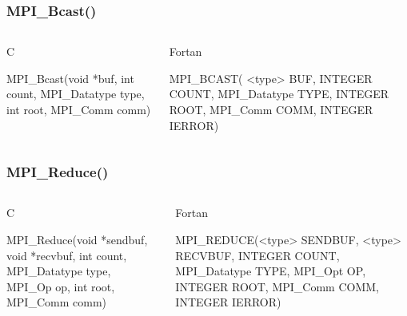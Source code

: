 \documentclass{beamer}
\begin{document}
\begin{frame}[fragile]
\frametitle{MPI\_Bcast()}
   \begin{columns}[T]
    \begin{column}{5cm}
     \begin{block}{C}
      \begin{semiverbatim}
MPI\_Bcast(void   *buf,
           int  count,
  MPI\_Datatype   type,
           int   root,
      MPI\_Comm   comm)
      \end{semiverbatim}
     \end{block}
    \end{column}
    \begin{column}{5cm}
     \begin{block}{Fortan}
      \begin{semiverbatim}
MPI\_BCAST( <type>    BUF,
         INTEGER   COUNT,
    MPI\_Datatype    TYPE,
         INTEGER    ROOT,
        MPI\_Comm    COMM,
         INTEGER  IERROR)
      \end{semiverbatim}
     \end{block}
    \end{column}
   \end{columns}
\end{frame}
\begin{frame}[fragile]
\frametitle{MPI\_Reduce()}
   \begin{columns}[T]
    \begin{column}{5cm}
     \begin{block}{C}
      \begin{semiverbatim}
MPI\_Reduce(void *sendbuf,
           void *recvbuf,
            int    count,
   MPI\_Datatype     type,
         MPI\_Op       op,
            int     root,
       MPI\_Comm     comm)
      \end{semiverbatim}
     \end{block}
    \end{column}
    \begin{column}{5cm}
     \begin{block}{Fortan}
      \begin{semiverbatim}
MPI\_REDUCE(<type> SENDBUF,
           <type> RECVBUF,
          INTEGER  COUNT,
     MPI\_Datatype   TYPE,
          MPI\_Opt     OP,
          INTEGER   ROOT,
         MPI\_Comm   COMM,
          INTEGER IERROR)
      \end{semiverbatim}
     \end{block}
    \end{column}
   \end{columns}
%
\end{frame}
\end{document}
